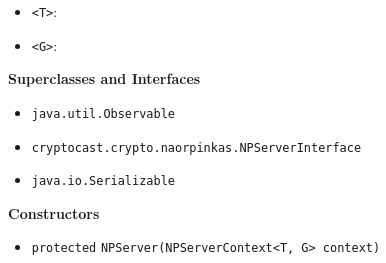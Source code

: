 \begin{itemize}
\item \lstinline|<T>|: 
\item \lstinline|<G>|: 
\end{itemize}


\textbf{\sffamily Superclasses and Interfaces}
\begin{itemize}
\item \lstinline|java.util.Observable|
\item \lstinline|cryptocast.crypto.naorpinkas.NPServerInterface|
\item \lstinline|java.io.Serializable|
\end{itemize}


\textbf{\sffamily Constructors}
\begin{itemize}
\item \lstinline|protected| \lstinline|NPServer|\lstinline|(NPServerContext<T, G> context)| \\[-0.6em]




\end{itemize}


